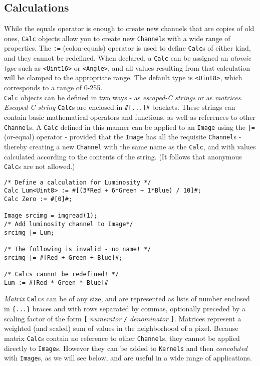 \subsection{Calculations}

While the equals operator is enough to create new channels that are copies of old ones,
\texttt{Calc} objects allow you to create new \texttt{Channel}s with a wide range of properties.
The \texttt{:=} (colon-equals) operator is used to define \texttt{Calc}s of either kind, and they cannot be redefined.
When declared, a \texttt{Calc} can be assigned an \emph{atomic type} such as \texttt{<Uint16>} or \texttt{<Angle>},
and all values resulting from that calculation will be clamped to the appropriate range.
The default type is \texttt{<Uint8>}, which corresponds to a range of 0-255.\\
  
\texttt{Calc} objects can be defined in two ways - as \emph{escaped-C strings} or as \emph{matrices}.\\


\emph{Escaped-C string} \texttt{Calc}s are enclosed in \texttt{\#[...]\#} brackets. These strings can contain basic mathematical
operators and functions, as well as references to other \texttt{Channel}s. A \texttt{Calc} 
defined in this manner can be applied to an \texttt{Image} using the \texttt{|=} (or-equal) operator -
provided that the \texttt{Image} has all the requisite \texttt{Channel}s - 
thereby creating a new \texttt{Channel} with the same name as the \texttt{Calc}, and with values calculated according 
to the contents of the string. (It follows that anonymous \texttt{Calc}s are not allowed.)\\

\begin{lstlisting}[language=CLAM,escapechar=\%]
/* Define a calculation for Luminosity */
Calc Lum<Uint8> := #[(3*Red + 6*Green + 1*Blue) / 10]#;
Calc Zero := #[0]#;

Image srcimg = imgread(1);
/* Add luminosity channel to Image*/
srcimg |= Lum;

/* The following is invalid - no name! */
srcimg |= #[Red + Green + Blue]#;

/* Calcs cannot be redefined! */
Lum := #[Red * Green * Blue]#
\end{lstlisting}

\emph{Matrix} \texttt{Calc}s can be of any size, and are represented as lists of number enclosed in
\texttt{\{...\}} braces and with rows separated by commas, optionally preceded by
a scaling factor of the form \texttt{[} \emph{numerator} \texttt{/} \emph{denominator} \texttt{]}.
Matrices represent a weighted (and scaled) sum of values in the neighborhood of a pixel.
Because matrix \texttt{Calc}s contain no reference to other \texttt{Channel}s, they cannot be applied
directly to \texttt{Image}s. However they can be added to \texttt{Kernels} and then \emph{convoluted}
with \texttt{Image}s, as we will see below, and are useful in a wide range of applications.\\

